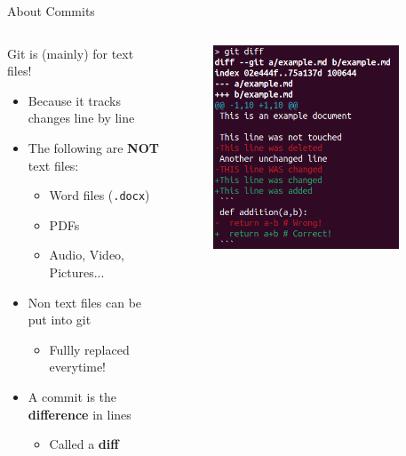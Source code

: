 \documentclass[compress,aspectratio=169]{beamer}
\begin{document}
  \begin{frame}{About Commits}
    \begin{columns}
      \begin{column}{0.6\textwidth}
        \begin{block}{Git is (mainly) for text files!}
          \begin{itemize}
            \item Because it tracks changes line by line
              \pause
            \item The following are \textbf{NOT} text files:
              \begin{itemize}
                \item Word files (\texttt{.docx})
                  \pause
                \item PDFs
                  \pause
                \item Audio, Video, Pictures...
              \end{itemize}
              \pause
            \item Non text files can be put into git
              \begin{itemize}
                \item Fullly replaced everytime!
              \end{itemize}
              \pause
            \item A commit is the \textbf{difference} in lines
              \begin{itemize}
                \item Called a \textbf{diff}
              \end{itemize}
          \end{itemize}
        \end{block}
      \end{column}
      \begin{column}{0.4\textwidth}
        \begin{figure}
          \pause
          \includegraphics[width=0.9\textwidth]{./assets/diff.png}

\end{figure}
\end{column}
\end{columns}
\end{frame}
\end{document}
